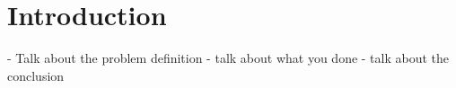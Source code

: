 \documentclass[12pt,twoside]{report}
\date{May 2019}
\begin{document}



\clearpage{\pagestyle{empty}\cleardoublepage}
\setcounter{page}{1}
\pagestyle{fancy}




\tableofcontents 


\setcounter{page}{1}
\fancyhead[LE,RO]{\slshape \rightmark}
\fancyhead[LO,RE]{\slshape \leftmark}

\chapter{Introduction}




- Talk about the problem definition
- talk about what you done
- talk about the conclusion


\end{document}
